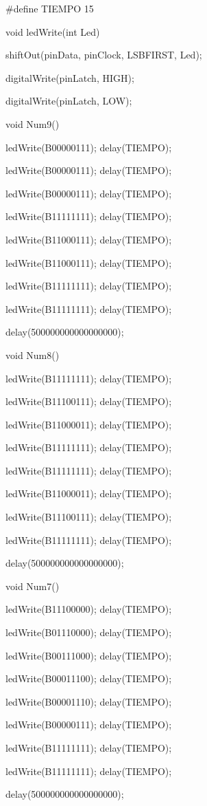 \documentclass{article}
\begin{document}
#define TIEMPO 15


void ledWrite(int Led){
   
   shiftOut(pinData, pinClock, LSBFIRST, Led);
   
   digitalWrite(pinLatch, HIGH);
   
   digitalWrite(pinLatch, LOW);
}

void Num9(){
     
   ledWrite(B00000111); delay(TIEMPO);
   
   ledWrite(B00000111); delay(TIEMPO);
   
   ledWrite(B00000111); delay(TIEMPO);
   
   ledWrite(B11111111); delay(TIEMPO);
   
   ledWrite(B11000111); delay(TIEMPO);
   
   ledWrite(B11000111); delay(TIEMPO);
   
   ledWrite(B11111111); delay(TIEMPO);
   
   ledWrite(B11111111); delay(TIEMPO);
  
  delay(500000000000000000);}
  
void Num8(){
     
   ledWrite(B11111111); delay(TIEMPO);
   
   ledWrite(B11100111); delay(TIEMPO);
   
   ledWrite(B11000011); delay(TIEMPO);
   
   ledWrite(B11111111); delay(TIEMPO);
   
   ledWrite(B11111111); delay(TIEMPO);
   
   ledWrite(B11000011); delay(TIEMPO);
   
   ledWrite(B11100111); delay(TIEMPO);
   
   ledWrite(B11111111); delay(TIEMPO);
  
  delay(500000000000000000);}
  
void Num7(){

   ledWrite(B11100000); delay(TIEMPO);

   ledWrite(B01110000); delay(TIEMPO);

   ledWrite(B00111000); delay(TIEMPO);

   ledWrite(B00011100); delay(TIEMPO);

   ledWrite(B00001110); delay(TIEMPO);

   ledWrite(B00000111); delay(TIEMPO);

   ledWrite(B11111111); delay(TIEMPO);

   ledWrite(B11111111); delay(TIEMPO);

  delay(500000000000000000);}
  
\end{document}
